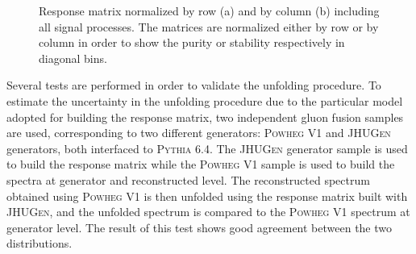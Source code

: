 \begin{figure}[!h]
\centering
{}
\caption{Response matrix normalized by row (a) and  by column (b) including all signal processes. The matrices are normalized either by row or by column in order to show the purity or stability respectively in diagonal bins.}\label{fig:matrix}
\end{figure}

Several tests are performed in order to validate the unfolding procedure. To estimate the uncertainty in the unfolding procedure due to the
particular model adopted for building the response matrix, two independent gluon fusion samples are used, corresponding to two different generators: \textsc{Powheg V1} and \textsc{JHUGen} generators, both interfaced to \textsc{Pythia 6.4}.
The \textsc{JHUGen} generator sample is used to build the response matrix while the
\textsc{Powheg V1} sample is used to build the \pth spectra at generator and reconstructed level. The reconstructed spectrum obtained using \textsc{Powheg V1} is then unfolded using the response matrix built with \textsc{JHUGen}, and the unfolded spectrum is compared to the \textsc{Powheg V1} spectrum at generator level. The result of this test shows good agreement between the two distributions.

